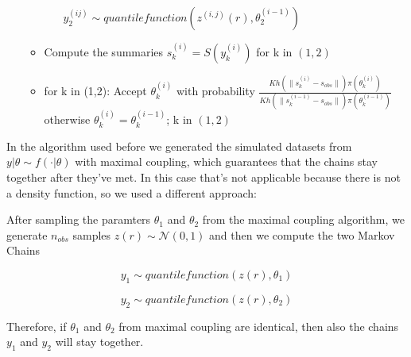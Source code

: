 \documentclass {article}
\begin{document}
\begin{enumerate}
\begin{itemize}
\begin{itemize}
		$ y_{2}^{(ij)} \sim quantile function(z^{(i,j)}(r), \theta_{2}^{(i-1)})$
		
	\end{itemize}
	
	\item Compute the summaries  $ s_{k}^{(i)} =S(y_{k}^{(i)})$ for k in $ (1,2) $
	
	
	\item for k in (1,2):
 Accept $\theta_{k}^{(i)}$ with probability $\frac{Kh(\|s_{k}^{(i)}-s_{obs}\|)\pi(\theta_{k}^{(i)})}{Kh(\|s_{k}^{(i-1)}- s_{obs}\|)\pi(\theta_{k}^{(i-1)})} $   otherwise $\theta_{k}^{(i)}=\theta_{k}^{(i-1)}$; k in $ (1,2)$
		

\end{itemize}

\end{enumerate}


In the algorithm used before we generated the simulated datasets from $ y| \theta \sim f(\cdot| \theta)$ with maximal coupling, which guarantees that the chains stay together after they've met.
In this case that's not applicable because there is not a density function, so we used a different approach:

After sampling the paramters $\theta_{1} $ and $ \theta_{2}$ from the maximal coupling algorithm, we generate $n_{obs}$ samples $z(r) \sim \mathcal{N}(0,1)$
and then we compute the two Markov Chains

$$ y_{1} \sim quantile function(z(r), \theta_{1})$$

$$ y_{2} \sim quantile function(z(r),\theta_{2})$$ 

Therefore, if $\theta_{1}  $ and $  \theta_{2}$ from maximal coupling are identical, then also the chains $y_{1} $ and $  y_{2}$ will stay together.

\newpage
\printbibliography


\end{document}
